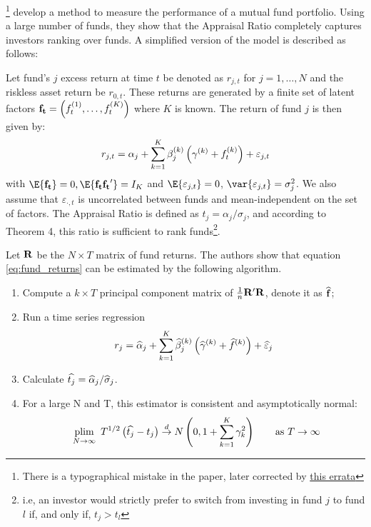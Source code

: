\citet{connor1986performance}\footnote{There is a typographical mistake in the paper, later corrected by \href{https://afajof.org/wp-content/uploads/files/clarifications/connor_korajczyk_errata.pdf}{this errata}} develop a method to measure the performance of a mutual fund portfolio. Using a large number of funds, they show that the \citet{treynor1973use} Appraisal Ratio completely captures investors ranking over funds. A simplified version of the model is described as follows:

Let fund's \(j\) excess return at time \(t\) be denoted as \(r_{j,t}\) for \(j = 1, \dots, N\) and the riskless asset return be \(r_{0,t}\). These returns are generated by a finite set of latent factors \(\mathbf{f_t} = \left( f_t^{(1)}, \dots, f_t^{(K)} \right)\) where \(K\) is known. The return of fund \(j\) is then given by:
\begin{equation}
    \label{eq:fund_returns}
    r_{j,t} = \alpha_j + \sum_{k = 1}^K\beta_j^{(k)}\left( \gamma^{(k)} + f_t^{(k)} \right)    + \varepsilon_{j,t}
\end{equation}
with \(\E{\bf{f_t}} = 0, \E{\bf{f_tf_t}^\prime} = I_K\) and \(\E{\varepsilon_{j,t}} = 0\), \(\var{\varepsilon_{j,t}} = \sigma_j^2\). We also assume that \(\varepsilon_{\cdot, t}\) is uncorrelated between funds and mean-independent on the set of factors.  
The Appraisal Ratio is defined as \(t_j = \alpha_j / \sigma_j\), and according to Theorem 4, this ratio is sufficient to rank funds\footnote{i.e, an investor would strictly prefer to switch from investing in fund \(j\) to fund \(l\) if, and only if, \(t_j > t_l\)}.

Let \(\bf{R}\) be the \(N \times T\) matrix of fund returns. The authors show that equation \eqref{eq:fund_returns} can be estimated by the following algorithm.
\begin{enumerate}[label = \arabic*), leftmargin = *]
    \item Compute a \(k \times T\) principal component matrix of \(\frac{1}{n} \bf{R}^\prime \bf{R}\), denote it as \(\widehat{\bf{f}}\);
    \item Run a time series regression 
    \begin{equation}
        \label{eq:ck_regression}
        r_j = \widehat{\alpha}_j + \sum_{k = 1}^K\widehat{\beta}_j^{(k)}\left( \widehat{\gamma}^{(k)} + \widehat{f}^{(k)} \right) + \widehat{\varepsilon}_j
    \end{equation}
    \item Calculate \(\widehat{t_j} = \widehat{\alpha}_j / \widehat{\sigma}_j\).
    \item For a large N and T, this estimator is consistent and asymptotically normal:
    \begin{equation}
        \label{eq:appraisal_distribution}
        \hspace{5pt}\underset{N \to \infty}{\text{plim}}\hspace{5pt} T^{1/2}\left( \widehat{t_j} - t_j \right) \overset{d}{\to} N\left( 0, 1 + \sum_{k=1}^K \gamma_k^2 \right) \qquad \text{as } T \to \infty
    \end{equation}
\end{enumerate}

